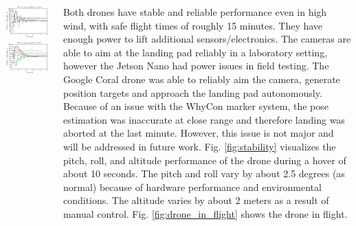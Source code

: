 \documentclass[a1paper, landscape, blockverticalspace=1cm, 14pt]{tikzposter}
\begin{document}
\begin{columns}
{        \vspace{-0.5cm}
        \begin{tikzfigure}
            \includegraphics[width=0.45\linewidth]{coral_gimbal_performance_x_axis.png}
            \includegraphics[width=0.45\linewidth]{coral_gimbal_performance_y_axis.png}
            \label{fig:gimbal_controller_performance}
        \end{tikzfigure}
    }

    {
        \normalsize
        Both drones have stable and reliable performance even in high wind, with safe flight times of roughly 15 minutes.
        They have enough power to lift additional sensors/electronics.
        The cameras are able to aim at the landing pad reliably in a laboratory setting, however the Jetson Nano had power issues in field testing.
        The Google Coral drone was able to reliably aim the camera, generate position targets and approach the landing pad autonomously.
        Because of an issue with the WhyCon marker system, the pose estimation was inaccurate at close range and therefore landing was aborted at the last minute.
        However, this issue is not major and will be addressed in future work.
        Fig. \ref{fig:stability} visualizes the pitch, roll, and altitude performance of the drone during a hover of about 10 seconds.
        The pitch and roll vary by about 2.5 degrees (as normal) because of hardware performance and environmental conditions.
        The altitude varies by about 2 meters as a result of manual control. Fig. \ref{fig:drone_in_flight} shows the drone in flight.

}
\end{columns}
\end{document}
